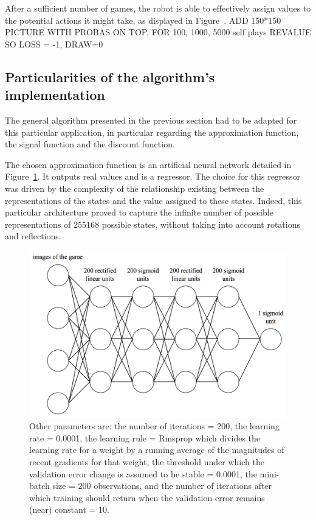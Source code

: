 \documentclass[letterpaper, 10.5 pt, conference]{ieeeconf}
\begin{document}
After a sufficient number of games, the robot is able to effectively assign values to the potential actions it might take, as displayed in Figure~.
ADD 150*150 PICTURE WITH PROBAS ON TOP, FOR 100, 1000, 5000 self plays
REVALUE SO LOSS = -1, DRAW=0

\subsection{Particularities of the algorithm's implementation}

The general algorithm presented in the previous section had to be adapted for this particular application, in particular regarding the approximation function, the signal function and the discount function.

The chosen approximation function is an artificial neural network detailed in Figure~\ref{fig:neuralnet}. It outputs real values and is a regressor. The choice for this regressor was driven by the complexity of the relationship existing between the representations of the states and the value assigned to these states. Indeed, this particular architecture proved to capture the infinite number of possible representations of $255168$ possible states, without taking into account rotations and reflections. 

\begin{figure}
\begin{center}
\includegraphics[scale=.25]{"NNview"}
\caption{Other parameters are: the number of iterations = 200, the learning rate = 0.0001, the learning rule = Rmsprop which divides the learning rate for a weight by a running average of the magnitudes of recent gradients for that weight, the threshold under which the validation error change is assumed to be stable = 0.0001, the mini-batch size = 200 observations, and the number of iterations after which training should return when the validation error remains (near) constant = 10.}
\label{fig:neuralnet}
\end{center}
\end{figure}
\end{document}
